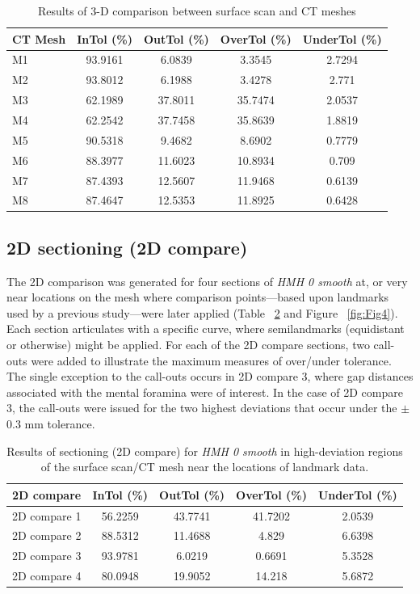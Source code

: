\documentclass[review]{elsarticle}
\begin{document}
\begin{table}[tbh]\centering
\footnotesize
\caption{Results of 3-D comparison between surface scan and CT meshes}
\centering
\begin{tabular}{lcccc}
\hline
CT Mesh & InTol (\%) & OutTol (\%) & OverTol (\%) & UnderTol (\%)\\
\hline
M1 & 93.9161 & 6.0839 & 3.3545 & 2.7294\\
M2 & 93.8012 & 6.1988 & 3.4278 & 2.771\\
M3 & 62.1989 & 37.8011 & 35.7474 & 2.0537\\
M4 & 62.2542 & 37.7458 & 35.8639 & 1.8819\\
M5 & 90.5318 & 9.4682 & 8.6902 & 0.7779\\
M6 & 88.3977 & 11.6023 & 10.8934 & 0.709\\
M7 & 87.4393 & 12.5607 & 11.9468 & 0.6139\\
M8 & 87.4647 & 12.5353 & 11.8925 & 0.6428\\
\hline
\end{tabular}
\label{tab:Tbl2}
\end{table}

\subsection{2D sectioning (2D compare)}

The 2D comparison was generated for four sections of \textit{HMH 0 smooth} at, or very near locations on the mesh where comparison points---based upon landmarks used by a previous study---were later applied (Table ~\ref{tab:Tbl3} and Figure ~\ref{fig:Fig4}). Each section articulates with a specific curve, where semilandmarks (equidistant or otherwise) might be applied. For each of the 2D compare sections, two call-outs were added to illustrate the maximum measures of over/under tolerance. The single exception to the call-outs occurs in 2D compare 3, where gap distances associated with the mental foramina were of interest. In the case of 2D compare 3, the call-outs were issued for the two highest deviations that occur under the $\pm$ 0.3 mm tolerance.

\begin{table}[tbh]\centering
\footnotesize
\caption{Results of sectioning (2D compare) for \textit{HMH 0 smooth} in high-deviation regions of the surface scan/CT mesh near the locations of landmark data.}
\centering
\begin{tabular}{lcccc}
\hline
2D compare & InTol (\%) & OutTol (\%) & OverTol (\%) & UnderTol (\%)\\
\hline
2D compare 1 & 56.2259 & 43.7741 & 41.7202 & 2.0539\\
2D compare 2 & 88.5312 & 11.4688 & 4.829 & 6.6398\\
2D compare 3 & 93.9781 & 6.0219 & 0.6691 & 5.3528\\
2D compare 4 & 80.0948 & 19.9052 & 14.218 & 5.6872\\
\hline
\end{tabular}
\label{tab:Tbl3}
\end{table}
\end{document}
